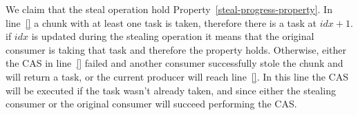 \vspace{5mm}\noindent
We claim that the steal operation hold Property~\ref{steal-progress-property}. In line~\ref{} a chunk with at least one task is taken, therefore there is a task at $idx+1$. if $idx$ is updated during the stealing operation it means that the original consumer is taking that task and therefore the property holds. Otherwise, either the CAS in line~\ref{} failed and another consumer successfully stole the chunk and will return a task, or the current producer will reach line~\ref{}. In this line the CAS will be executed if the task wasn't already taken, and since either the stealing consumer or the original consumer will succeed performing the CAS.